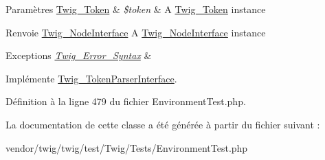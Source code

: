 \begin{DoxyParams}[1]{Paramètres}
\hyperlink{class_twig___token}{Twig\+\_\+\+Token} & {\em \$token} & A \hyperlink{class_twig___token}{Twig\+\_\+\+Token} instance\\
\hline
\end{DoxyParams}
\begin{DoxyReturn}{Renvoie}
\hyperlink{interface_twig___node_interface}{Twig\+\_\+\+Node\+Interface} A \hyperlink{interface_twig___node_interface}{Twig\+\_\+\+Node\+Interface} instance
\end{DoxyReturn}

\begin{DoxyExceptions}{Exceptions}
{\em \hyperlink{class_twig___error___syntax}{Twig\+\_\+\+Error\+\_\+\+Syntax}} & \\
\hline
\end{DoxyExceptions}


Implémente \hyperlink{interface_twig___token_parser_interface_a5dfa2e269321584fb74e8b43dabe0efd}{Twig\+\_\+\+Token\+Parser\+Interface}.



Définition à la ligne 479 du fichier Environment\+Test.\+php.



La documentation de cette classe a été générée à partir du fichier suivant \+:\begin{DoxyCompactItemize}
\item 
vendor/twig/twig/test/\+Twig/\+Tests/Environment\+Test.\+php\end{DoxyCompactItemize}
